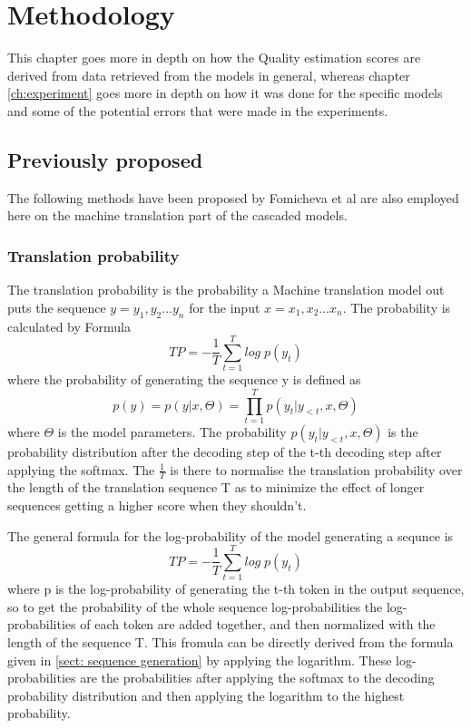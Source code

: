 
\chapter{Methodology}
\label{ch:methods}
This chapter goes more in depth on how the Quality estimation scores are derived from data retrieved from the models in general, whereas chapter \autoref{ch:experiment} goes more in depth on how it was done for the specific models and some of the potential errors that were made in the experiments.


\section{Previously proposed}
The following methods have been proposed by Fomicheva et al \cite{fomicheva2020unsupervised} are also employed here on the machine translation part of the cascaded models.

\subsection{Translation probability}
The translation probability is the probability a Machine translation model out puts the sequence $y = y_1, y_2 \dots y_n$ for the input $x=x_1, x_2 \dots x_n$. The probability is calculated by Formula $$TP=-\frac{1}{T}\sum_{t=1}^T log\; p(y_t) \label{formula:translation Probability}$$ where the probability of generating the sequence y is defined as $$ p(y)=p(y|x,\Theta)=\prod_{t=1}^T p(y_t|y_{<t}, x, \Theta)$$ where $\Theta$ is the model parameters.
The probability $p(y_t|y_{<t}, x,\Theta)$ is the probability distribution after the decoding step of the t-th decoding step after applying the softmax.
The $\frac{1}{T}$ is there to normalise the translation probability over the length of the translation sequence T as to minimize the effect of longer sequences getting a higher score when they shouldn't. 

The general formula for the log-probability of the model generating a sequnce is $$TP=-\frac{1}{T}\sum_{t=1}^T log\; p(y_t)$$
where p is the log-probability of generating the t-th token in the output sequence, so to get the probability of the whole sequence log-probabilities the log-probabilities of each token are added together, and then normalized with the length of the sequence T. This fromula can be directly derived from the formula given in \autoref{sect: sequence generation} by applying the logarithm. 
These log-probabilities are the probabilities after applying the softmax to the decoding probability distribution and then applying the logarithm to the highest probability.

